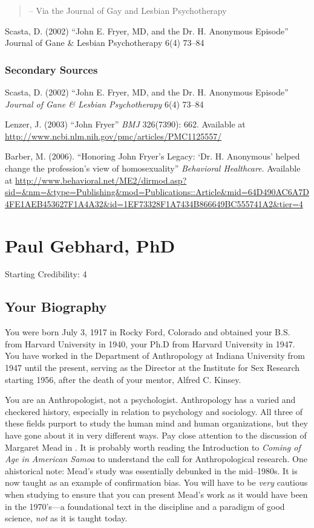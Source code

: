 \begin{refsection}
\begin{quote}
– Via the Journal of Gay and Lesbian Psychotherapy
\end{quote}

Scasta, D. (2002) “John E. Fryer, MD, and the Dr. H. Anonymous Episode” Journal of Gane \& Lesbian Psychotherapy 6(4) 73--84

\subsection{Secondary Sources}
\label{secondarysources}

Scasta, D. (2002) “John E. Fryer, MD, and the Dr. H. Anonymous Episode” \emph{Journal of Gane \& Lesbian Psychotherapy} 6(4) 73--84

Lenzer, J. (2003) “John Fryer” \emph{BMJ} 326(7390): 662. Available at \url{http://www.ncbi.nlm.nih.gov/pmc/articles/PMC1125557/}

Barber, M. (2006). “Honoring John Fryer's Legacy: `Dr. H. Anonymous' helped change the profession's view of homosexuality” \emph{Behavioral Healthcare}. Available at \url{http://www.behavioral.net/ME2/dirmod.asp?sid=&nm=&type=Publishing&mod=Publications::Article&mid=64D490AC6A7D4FE1AEB453627F1A4A32&id=1EF73328F1A7434B866649BC555741A2&tier=4}

\chapter{Paul Gebhard, PhD}
\label{paulgebhardphd}

Starting Credibility: 4

\section{Your Biography}
\label{yourbiography}

You were born July 3, 1917 in Rocky Ford, Colorado and obtained your B.S. from Harvard University in 1940, your Ph.D from Harvard University in 1947. You have worked in the Department of Anthropology at Indiana University from 1947 until the present, serving as the Director at the Institute for Sex Research starting 1956, after the death of your mentor, Alfred C. Kinsey.

You are an Anthropologist, not a psychologist. Anthropology has a varied and checkered history, especially in relation to psychology and sociology. All three of these fields purport to study the human mind and human organizations, but they have gone about it in very different ways. Pay close attention to the discussion of Margaret Mead in . It is probably worth reading the Introduction to \emph{Coming of Age in American Samoa} to understand the call for Anthropological research. One ahistorical note: Mead’s study was essentially debunked in the mid--1980s. It is now taught as an example of confirmation bias. You will have to be \emph{very} cautious when studying to ensure that you can present Mead’s work as it would have been in the 1970’s---a foundational text in the discipline and a paradigm of good science, \emph{not} as it is taught today. 


\end{refsection}
